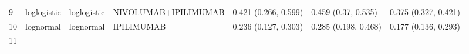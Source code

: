 \documentclass[
]{article}
\begin{document}
\begin{longtable}[]{@{}lllllll@{}}
\begin{minipage}[t]{0.03\columnwidth}\raggedright
9\strut
\end{minipage} & \begin{minipage}[t]{0.09\columnwidth}\raggedright
loglogistic\strut
\end{minipage} & \begin{minipage}[t]{0.09\columnwidth}\raggedright
loglogistic\strut
\end{minipage} & \begin{minipage}[t]{0.15\columnwidth}\raggedright
NIVOLUMAB+IPILIMUMAB\strut
\end{minipage} & \begin{minipage}[t]{0.15\columnwidth}\raggedright
0.421 (0.266, 0.599)\strut
\end{minipage} & \begin{minipage}[t]{0.15\columnwidth}\raggedright
0.459 (0.37, 0.535)\strut
\end{minipage} & \begin{minipage}[t]{0.15\columnwidth}\raggedright
0.375 (0.327, 0.421)\strut
\end{minipage}\tabularnewline
\begin{minipage}[t]{0.03\columnwidth}\raggedright
10\strut
\end{minipage} & \begin{minipage}[t]{0.09\columnwidth}\raggedright
lognormal\strut
\end{minipage} & \begin{minipage}[t]{0.09\columnwidth}\raggedright
lognormal\strut
\end{minipage} & \begin{minipage}[t]{0.15\columnwidth}\raggedright
IPILIMUMAB\strut
\end{minipage} & \begin{minipage}[t]{0.15\columnwidth}\raggedright
0.236 (0.127, 0.303)\strut
\end{minipage} & \begin{minipage}[t]{0.15\columnwidth}\raggedright
0.285 (0.198, 0.468)\strut
\end{minipage} & \begin{minipage}[t]{0.15\columnwidth}\raggedright
0.177 (0.136, 0.293)\strut
\end{minipage}\tabularnewline
\begin{minipage}[t]{0.03\columnwidth}\raggedright
11\strut
\end{minipage} & \begin{minipage}[t]{0.09\columnwidth}\raggedright

\end{minipage}
\end{longtable}
\end{document}
